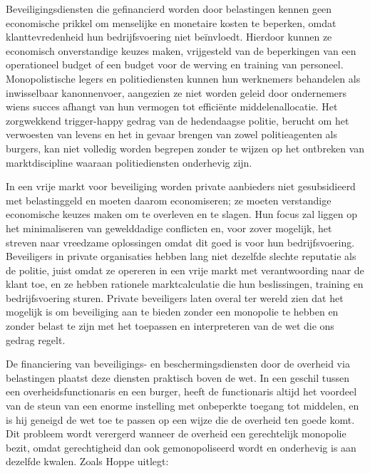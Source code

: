 Beveiligingsdiensten die gefinancierd worden door belastingen kennen geen economische prikkel om menselijke en monetaire kosten te beperken, omdat klanttevredenheid hun bedrijfsvoering niet beïnvloedt. Hierdoor kunnen ze economisch onverstandige keuzes maken, vrijgesteld van de beperkingen van een operationeel budget of een budget voor de werving en training van personeel. Monopolistische legers en politiediensten kunnen hun werknemers behandelen als inwisselbaar kanonnenvoer, aangezien ze niet worden geleid door ondernemers wiens succes afhangt van hun vermogen tot efficiënte middelenallocatie. Het zorgwekkend trigger-happy gedrag van de hedendaagse politie, berucht om het verwoesten van levens en het in gevaar brengen van zowel politieagenten als burgers, kan niet volledig worden begrepen zonder te wijzen op het ontbreken van marktdiscipline waaraan politiediensten onderhevig zijn.

In een vrije markt voor beveiliging worden private aanbieders niet gesubsidieerd met belastinggeld en moeten daarom economiseren; ze moeten verstandige economische keuzes maken om te overleven en te slagen. Hun focus zal liggen op het minimaliseren van gewelddadige conflicten en, voor zover mogelijk, het streven naar vreedzame oplossingen omdat dit goed is voor hun bedrijfsvoering. Beveiligers in private organisaties hebben lang niet dezelfde slechte reputatie als de politie, juist omdat ze opereren in een vrije markt met verantwoording naar de klant toe, en ze hebben rationele marktcalculatie die hun beslissingen, training en bedrijfsvoering sturen. Private beveiligers laten overal ter wereld zien dat het mogelijk is om beveiliging aan te bieden zonder een monopolie te hebben en zonder belast te zijn met het toepassen en interpreteren van de wet die ons gedrag regelt.

De financiering van beveiligings- en beschermingsdiensten door de overheid via belastingen plaatst deze diensten praktisch boven de wet. In een geschil tussen een overheidsfunctionaris en een burger, heeft de functionaris altijd het voordeel van de steun van een enorme instelling met onbeperkte toegang tot middelen, en is hij geneigd de wet toe te passen op een wijze die de overheid ten goede komt. Dit probleem wordt verergerd wanneer de overheid een gerechtelijk monopolie bezit, omdat gerechtigheid dan ook gemonopoliseerd wordt en onderhevig is aan dezelfde kwalen. Zoals Hoppe uitlegt:

